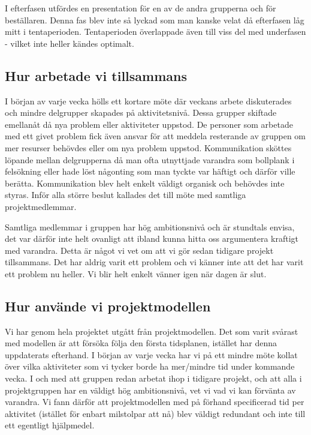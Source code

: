 \documentclass[a4paper,12pt,fleqn]{article}
\begin{document}
I efterfasen utfördes en presentation för en av de andra grupperna och för beställaren. Denna fas blev inte så lyckad som man kanske velat då efterfasen låg mitt i tentaperioden. Tentaperioden överlappade även till viss del med underfasen - vilket inte heller kändes optimalt. 


\subsection{Hur arbetade vi tillsammans}
I början av varje vecka hölls ett kortare möte där veckans arbete diskuterades och mindre delgrupper skapades på aktivitetsnivå. Dessa grupper skiftade emellanåt då nya problem eller aktiviteter uppstod. De personer som arbetade med ett givet problem fick även ansvar för att meddela resterande av gruppen om mer resurser behövdes eller om nya problem uppstod. Kommunikation sköttes löpande mellan delgrupperna då man ofta utnyttjade varandra som bollplank i felsökning eller hade löst någonting som man tyckte var häftigt och därför ville berätta. Kommunikation blev helt enkelt väldigt organisk och behövdes inte styras. 
Inför alla större beslut kallades det till möte med samtliga projektmedlemmar.

Samtliga medlemmar i gruppen har hög ambitionsnivå och är stundtals envisa, det var därför inte helt ovanligt att ibland kunna hitta oss argumentera kraftigt med varandra. Detta är något vi vet om att vi gör sedan tidigare projekt tillsammans. Det har aldrig varit ett problem och vi känner inte att det har varit ett problem nu heller. Vi blir helt enkelt vänner igen när dagen är slut. 

\subsection{Hur använde vi projektmodellen}
Vi har genom hela projektet utgått från projektmodellen. Det som varit svårast med modellen är att försöka följa den första tidsplanen, istället har denna uppdaterats efterhand. I början av varje vecka har vi på ett mindre möte kollat över vilka aktiviteter som vi tycker borde ha mer/mindre tid under kommande vecka. I och med att gruppen redan arbetat ihop i tidigare projekt, och att alla i projektgruppen har en väldigt hög ambitionsnivå, vet vi vad vi kan förvänta av varandra. Vi fann därför att projektmodellen med på förhand specificerad tid per aktivitet (istället för enbart milstolpar att nå) blev väldigt redundant och inte till ett egentligt hjälpmedel. 
\end{document}
